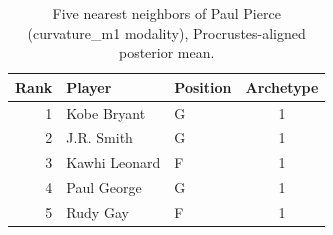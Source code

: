 \begin{table}[htbp]
  \centering\small
  \begin{tabular}{rllc}
    \toprule
    Rank & Player & Position & Archetype \\
    \midrule
    1 & Kobe Bryant & G & 1 \\
    2 & J.R. Smith & G & 1 \\
    3 & Kawhi Leonard & F & 1 \\
    4 & Paul George & G & 1 \\
    5 & Rudy Gay & F & 1 \\
    \bottomrule
  \end{tabular}
  \caption{Five nearest neighbors of Paul Pierce (curvature_m1 modality), Procrustes-aligned posterior mean.}
  \label{tab:Paul_Pierce_neighbors_curvature_m1}
\end{table}

